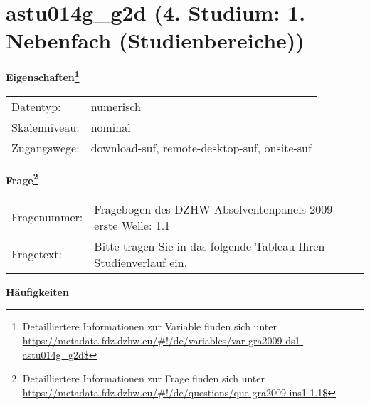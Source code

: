 
    \setcounter{footnote}{0}

    \vspace*{-1.8cm}
	\section{astu014g\_g2d (4. Studium: 1. Nebenfach (Studienbereiche))}
	\label{section:astu014g_g2d}



    \vspace*{0.5cm}
    \noindent\textbf{Eigenschaften\footnote{Detailliertere Informationen zur Variable finden sich unter
		\url{https://metadata.fdz.dzhw.eu/\#!/de/variables/var-gra2009-ds1-astu014g_g2d$}}}\\
	\begin{tabularx}{\hsize}{@{}lX}
	Datentyp: & numerisch \\
	Skalenniveau: & nominal \\
	Zugangswege: &
	  download-suf, 
	  remote-desktop-suf, 
	  onsite-suf
 \\
    \end{tabularx}



				\vspace*{0.5cm}
                \noindent\textbf{Frage\footnote{Detailliertere Informationen zur Frage finden sich unter
		              \url{https://metadata.fdz.dzhw.eu/\#!/de/questions/que-gra2009-ins1-1.1$}}}\\
				\begin{tabularx}{\hsize}{@{}lX}
					Fragenummer: &
					  Fragebogen des DZHW-Absolventenpanels 2009 - erste Welle:
					  1.1
 \\
					Fragetext: & Bitte tragen Sie in das folgende Tableau Ihren Studienverlauf ein. \\
				\end{tabularx}





        		\vspace*{0.5cm}
                \noindent\textbf{Häufigkeiten}

